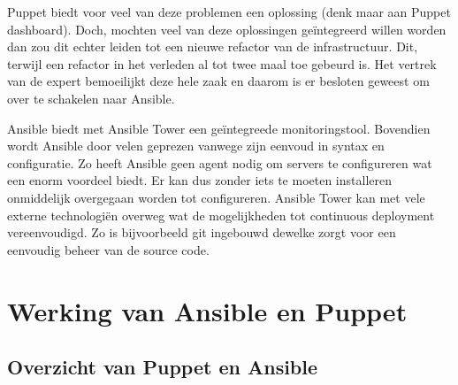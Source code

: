 Puppet biedt voor veel van deze problemen een oplossing (denk maar aan Puppet dashboard). Doch, mochten veel van deze oplossingen ge\"integreerd willen worden dan zou dit echter leiden tot een  nieuwe refactor van de infrastructuur. Dit, terwijl een refactor in het verleden al tot twee maal toe gebeurd is. Het vertrek van de expert bemoeilijkt deze hele zaak en daarom is er besloten geweest om over te schakelen naar Ansible. 

Ansible biedt met Ansible Tower een ge\"integreede monitoringstool. Bovendien wordt Ansible door velen geprezen vanwege zijn eenvoud in syntax en configuratie. Zo heeft Ansible geen agent nodig om servers te configureren wat een enorm voordeel biedt. Er kan dus zonder iets te moeten installeren onmiddelijk overgegaan worden tot configureren. Ansible Tower kan met vele externe technologi\"en overweg wat de mogelijkheden tot continuous deployment vereenvoudigd. Zo is bijvoorbeeld git ingebouwd dewelke zorgt voor een eenvoudig beheer van de source code.


\section{Werking van Ansible en Puppet}
\label{sec:methodologie-technische-verschillen}

\subsection{Overzicht van Puppet en Ansible}



